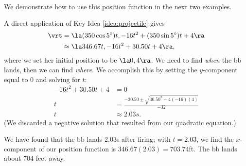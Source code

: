 We demonstrate how to use this position function in the next two examples.\\

{A direct application of Key Idea \ref{idea:projectile} gives
\begin{align*}
\vrt &= \la (350\cos 5^\circ)t, -16t^2 + (350\sin 5^\circ)t + 4\ra\\
&\approx \la 346.67t, -16t^2+30.50t+4\ra,
\end{align*}
where we set her initial position to be $\la 0,4\ra$.
We need to find \emph{when} the bb lands, then we can find \emph{where}. We accomplish this by setting the $y$-component equal to 0 and solving for $t$:
\begin{align*}
-16t^2+30.50t+4 &= 0 \\
t &= \frac{-30.50 \pm \sqrt{30.50^2-4(-16)(4)}}{-32}\\
t &\approx 2.03s.
\end{align*}
(We discarded a negative solution that resulted from our quadratic equation.) 

We have found that the bb lands 2.03s after firing; with $t=2.03$, we find the $x$-component of our position function is $346.67(2.03) = 703.74$ft. The bb lands about 704 feet away.
}\\

